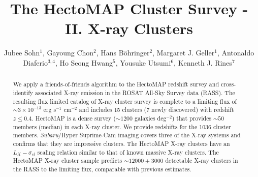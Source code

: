 \documentclass[iop, apj]{emulateapj}
\begin{document}
\title{The HectoMAP Cluster Survey - II. X-ray Clusters}

\author{Jubee Sohn$^{1}$, 
        Gayoung Chon$^{2}$, 
        Hans B{\"o}hringer$^{2}$, 
        Margaret J. Geller$^{1}$,  
        Antonaldo Diaferio$^{3, 4}$, 
        Ho Seong Hwang$^{5}$, 
        Yousuke Utsumi$^{6}$,
        Kenneth J. Rines$^{7}$}
        

\begin{abstract}
We apply a friends-of-friends algorithm to the HectoMAP redshift survey 
 and cross-identify associated X-ray emission in the ROSAT All-Sky Survey data (RASS). 
The resulting flux limited catalog of X-ray cluster survey is complete to a limiting flux of  
 $\sim 3 \times 10^{-13}$ erg s$^{-1}$ cm$^{-2}$ and 
 includes 15 clusters (7 newly discovered) with redshift $z \leq 0.4$.
HectoMAP is a dense survey ($\sim 1200$ galaxies deg$^{-2}$) 
 that provides $\sim 50$ members (median) in each X-ray cluster. 
We provide redshifts for the 1036 cluster members. 
{\it Subaru}/Hyper Suprime-Cam imaging covers 
 three of the X-ray systems and 
 confirms that they are impressive clusters.
The HectoMAP X-ray clusters have an $L_{X} - \sigma_{cl}$ scaling relation
 similar to that of known massive X-ray clusters. 
The HectoMAP X-ray cluster sample predicts
 $\sim12000 \pm 3000$ detectable X-ray clusters in the RASS to the limiting flux,
 comparable with previous estimates.
\end{abstract}
\end{document}

